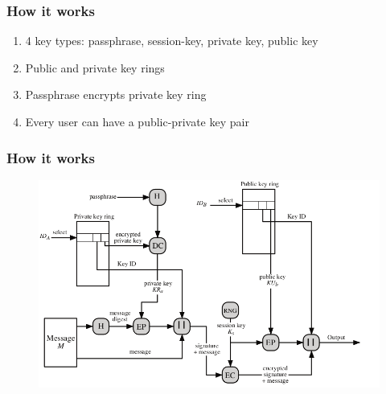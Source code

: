 \documentclass{beamer}
\begin{document}
\begin{frame}
\frametitle{How it works}
\begin{enumerate}
\item 4 key types: passphrase, session-key, private key, public key
\item Public and private key rings
\item Passphrase encrypts private key ring
\item Every user can have a public-private key pair
\end{enumerate}
\end{frame}


\begin{frame}
\frametitle{How it works}
\begin{figure}
\includegraphics[width=\textwidth]{PgpMsgGen}
\end{figure}
\end{frame}

\end{document}
